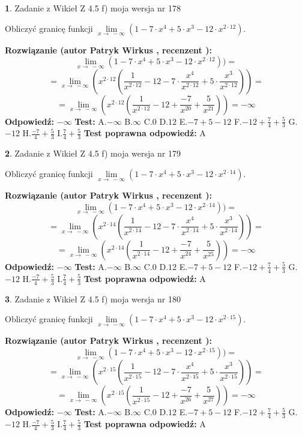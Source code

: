 \documentclass[12pt, a4paper]{article}
\theoremstyle{definition} %
\newtheorem{zad}{}
\newcommand{\zadStart}[1]{\begin{zad}#1\newline}
\newcommand{\zadStop}{\end{zad}}
\newcommand{\rozwStart}[2]{\noindent \textbf{Rozwiązanie (autor #1 , recenzent #2): }\newline}
\newcommand{\rozwStop}{\newline}
\newcommand{\odpStart}{\noindent \textbf{Odpowiedź:}\newline}
\newcommand{\odpStop}{\newline}
\newcommand{\testStart}{\noindent \textbf{Test:}\newline}
\newcommand{\testStop}{\newline}
\newcommand{\kluczStart}{\noindent \textbf{Test poprawna odpowiedź:}\newline}
\newcommand{\kluczStop}{\newline}
\begin{document}
\zadStart{Zadanie z Wikieł Z 4.5 f) moja wersja nr 178}



Obliczyć granicę funkcji  $\lim\limits_{x\to\ -\infty}(1 - 7 \cdot x^{4}+5 \cdot x^{3}- 12 \cdot x^{2\cdot12})$.
\zadStop
\rozwStart{Patryk Wirkus}{}
$$\lim\limits_{x\to\ -\infty}(1 - 7 \cdot x^{4}+5 \cdot x^{3}- 12 \cdot x^{2\cdot12}))=$$
$$=\lim\limits_{x\to\ -\infty}(x^{2\cdot12}(\frac{1}{x^{2\cdot12}}-12 -7 \cdot \frac{x^{4}}{x^{2\cdot12}}+5 \cdot \frac{x^{3}}{x^{2\cdot12}}))=$$
$$=\lim\limits_{x\to\ -\infty}(x^{2\cdot12}(\frac{1}{x^{2\cdot12}}-12 + \frac{-7}{x^{20}}+ \frac{5}{x^{21}}))=-\infty$$
\rozwStop
\odpStart
$-\infty$
\odpStop
\testStart
A.$-\infty$ B.$\infty$ C.$0$ D.$12$ E.$-7 + 5 - 12$
F.$-12+\frac{7}{4}+\frac{5}{3}$ G.$-12$
H.$\frac{-7}{4}+\frac{5}{3}$
I.$\frac{7}{4}+\frac{5}{3}$
\testStop
\kluczStart
A
\kluczStop



\zadStart{Zadanie z Wikieł Z 4.5 f) moja wersja nr 179}



Obliczyć granicę funkcji  $\lim\limits_{x\to\ -\infty}(1 - 7 \cdot x^{4}+5 \cdot x^{3}- 12 \cdot x^{2\cdot14})$.
\zadStop
\rozwStart{Patryk Wirkus}{}
$$\lim\limits_{x\to\ -\infty}(1 - 7 \cdot x^{4}+5 \cdot x^{3}- 12 \cdot x^{2\cdot14}))=$$
$$=\lim\limits_{x\to\ -\infty}(x^{2\cdot14}(\frac{1}{x^{2\cdot14}}-12 -7 \cdot \frac{x^{4}}{x^{2\cdot14}}+5 \cdot \frac{x^{3}}{x^{2\cdot14}}))=$$
$$=\lim\limits_{x\to\ -\infty}(x^{2\cdot14}(\frac{1}{x^{2\cdot14}}-12 + \frac{-7}{x^{24}}+ \frac{5}{x^{25}}))=-\infty$$
\rozwStop
\odpStart
$-\infty$
\odpStop
\testStart
A.$-\infty$ B.$\infty$ C.$0$ D.$12$ E.$-7 + 5 - 12$
F.$-12+\frac{7}{4}+\frac{5}{3}$ G.$-12$
H.$\frac{-7}{4}+\frac{5}{3}$
I.$\frac{7}{4}+\frac{5}{3}$
\testStop
\kluczStart
A
\kluczStop



\zadStart{Zadanie z Wikieł Z 4.5 f) moja wersja nr 180}



Obliczyć granicę funkcji  $\lim\limits_{x\to\ -\infty}(1 - 7 \cdot x^{4}+5 \cdot x^{3}- 12 \cdot x^{2\cdot15})$.
\zadStop
\rozwStart{Patryk Wirkus}{}
$$\lim\limits_{x\to\ -\infty}(1 - 7 \cdot x^{4}+5 \cdot x^{3}- 12 \cdot x^{2\cdot15}))=$$
$$=\lim\limits_{x\to\ -\infty}(x^{2\cdot15}(\frac{1}{x^{2\cdot15}}-12 -7 \cdot \frac{x^{4}}{x^{2\cdot15}}+5 \cdot \frac{x^{3}}{x^{2\cdot15}}))=$$
$$=\lim\limits_{x\to\ -\infty}(x^{2\cdot15}(\frac{1}{x^{2\cdot15}}-12 + \frac{-7}{x^{26}}+ \frac{5}{x^{27}}))=-\infty$$
\rozwStop
\odpStart
$-\infty$
\odpStop
\testStart
A.$-\infty$ B.$\infty$ C.$0$ D.$12$ E.$-7 + 5 - 12$
F.$-12+\frac{7}{4}+\frac{5}{3}$ G.$-12$
H.$\frac{-7}{4}+\frac{5}{3}$
I.$\frac{7}{4}+\frac{5}{3}$
\testStop
\kluczStart
A
\kluczStop
\end{document}
